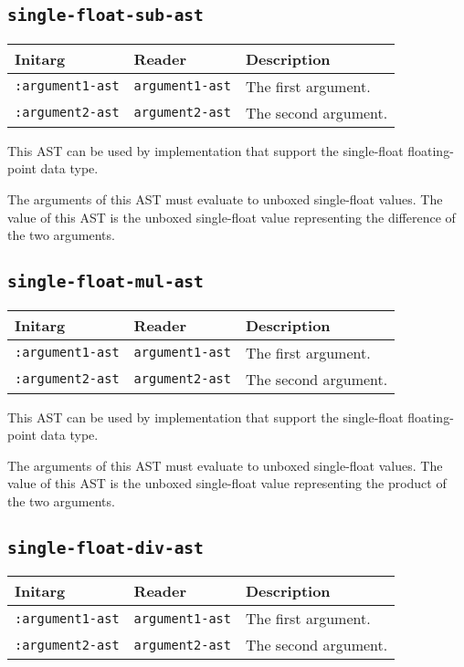 \subsection{\texttt{single-float-sub-ast}}
\label{sec-ast-single-float-sub}

\begin{tabular}{|l|l|l|}
\hline
Initarg & Reader & Description\\
\hline\hline
\texttt{:argument1-ast} & \texttt{argument1-ast} & The first argument.\\
\hline
\texttt{:argument2-ast} & \texttt{argument2-ast} & The second argument.\\
\hline
\end{tabular}

This AST can be used by implementation that support the single-float
floating-point data type.  

The arguments of this AST must evaluate to unboxed single-float
values.  The value of this AST is the unboxed single-float value
representing the difference of the two arguments.

\subsection{\texttt{single-float-mul-ast}}
\label{sec-ast-single-float-mul}

\begin{tabular}{|l|l|l|}
\hline
Initarg & Reader & Description\\
\hline\hline
\texttt{:argument1-ast} & \texttt{argument1-ast} & The first argument.\\
\hline
\texttt{:argument2-ast} & \texttt{argument2-ast} & The second argument.\\
\hline
\end{tabular}

This AST can be used by implementation that support the single-float
floating-point data type.  

The arguments of this AST must evaluate to unboxed single-float
values.  The value of this AST is the unboxed single-float value
representing the product of the two arguments.

\subsection{\texttt{single-float-div-ast}}
\label{sec-ast-single-float-div}

\begin{tabular}{|l|l|l|}
\hline
Initarg & Reader & Description\\
\hline\hline
\texttt{:argument1-ast} & \texttt{argument1-ast} & The first argument.\\
\hline
\texttt{:argument2-ast} & \texttt{argument2-ast} & The second argument.\\
\hline
\end{tabular}

